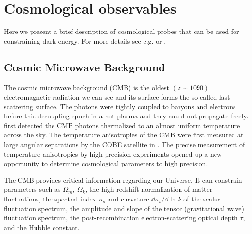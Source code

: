 \section{Cosmological observables}
Here we present a brief description of cosmological probes that can be used for constraining dark energy. For more details see e.g. \textcite{weinberg_observational_2013} or \textcite{DE_probes2}.



\subsection{Cosmic Microwave Background}
The cosmic microwave background (CMB) is the oldest $(z\sim1090)$ electromagnetic radiation we can see and its surface forms the so-called last scattering surface. The photons were tightly coupled to baryons and electrons before this decoupling epoch in a hot plasma and they could not propagate freely. \textcite{1965ApJ...142..419P} first detected the CMB photons thermalized to an almost uniform temperature across the sky. The temperature anisotropies of the CMB were first measured at large angular separations by the COBE satellite in \textcite{1992ApJ...396L...1S}. The precise measurement of temperature anisotropies by high-precision experiments \parencite[e.g.][]{2003ApJS..148..175S} opened up a new opportunity to determine cosmological parameters to high precision.

The CMB provides critical information regarding our Universe. It can constrain parameters such as $\Omega_m,\ \Omega_k$, the high-redshift normalization of matter fluctuations, the spectral index $n_s$ and curvature $\dd n_s/\dd \ln k$ of the scalar fluctuation spectrum, the amplitude and slope of the tensor (gravitational wave) fluctuation spectrum, the post-recombination electron-scattering optical depth $\tau$, and the Hubble constant.


